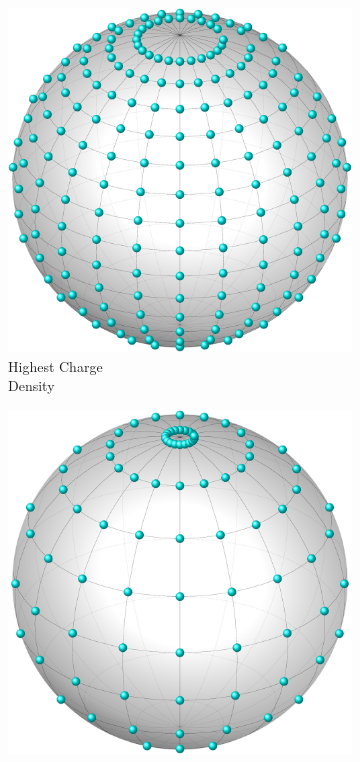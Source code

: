 \documentclass[10pt,letterpaper]{article}
\begin{document}
\newpage
\begin{figure}[h!]%
	\centering
	\begin{subfigure}[b]{0.3\textwidth}
		\centering
		\includegraphics[scale=0.2]{latticeDense.pdf}
		\caption{Highest Charge \\Density}
		\label{fig:gull}
	\end{subfigure}
	\begin{subfigure}[b]{0.3\textwidth}
		\centering
		\includegraphics[scale=0.2]{latticeMid.pdf}

\end{subfigure}
\end{figure}
\end{document}
